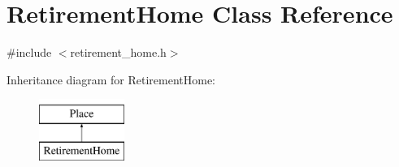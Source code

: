 \hypertarget{classRetirementHome}{}\section{Retirement\+Home Class Reference}
\label{classRetirementHome}


{\ttfamily \#include $<$retirement\+\_\+home.\+h$>$}

Inheritance diagram for Retirement\+Home\+:\begin{figure}[H]
\begin{center}
\leavevmode
\includegraphics[height=2.000000cm]{classRetirementHome}
\end{center}
\end{figure}
